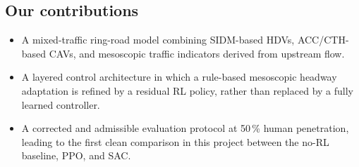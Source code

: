 \subsection{Our contributions}
\begin{itemize}
    \item A mixed-traffic ring-road model combining SIDM-based HDVs, ACC/CTH-based CAVs, and mesoscopic traffic indicators derived from upstream flow.
    \item A layered control architecture in which a rule-based mesoscopic headway adaptation is refined by a residual RL policy, rather than replaced by a fully learned controller.
    \item A corrected and admissible evaluation protocol at 50\,\% human penetration, leading to the first clean comparison in this project between the no-RL baseline, PPO, and SAC.
\end{itemize}
